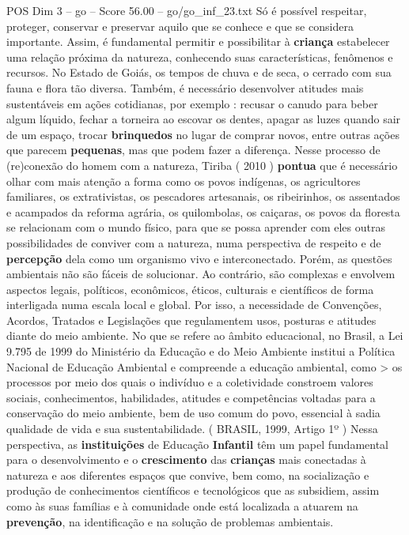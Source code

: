 \begin{textsample}{POS Dim 3 – go – Score 56.00 – go/go\_inf\_23.txt}
Só é possível respeitar, proteger, conservar e preservar aquilo que se conhece e que se considera importante.
Assim, é fundamental permitir e possibilitar à \textbf{criança} estabelecer uma relação próxima da natureza, conhecendo suas características, fenômenos e recursos.
No Estado de Goiás, os tempos de chuva e de seca, o cerrado com sua fauna e flora tão diversa.
Também, é necessário desenvolver atitudes mais sustentáveis em ações cotidianas, por exemplo : recusar o canudo para beber algum líquido, fechar a torneira ao escovar os dentes, apagar as luzes quando sair de um espaço, trocar \textbf{brinquedos} no lugar de comprar novos, entre outras ações que parecem \textbf{pequenas}, mas que podem fazer a diferença.
Nesse processo de (re)conexão do homem com a natureza, Tiriba ( 2010 ) \textbf{pontua} que é necessário olhar com mais atenção a forma como os povos indígenas, os agricultores familiares, os extrativistas, os pescadores artesanais, os ribeirinhos, os assentados e acampados da reforma agrária, os quilombolas, os caiçaras, os povos da floresta se relacionam com o mundo físico, para que se possa aprender com eles outras possibilidades de conviver com a natureza, numa perspectiva de respeito e de \textbf{percepção} dela como um organismo vivo e interconectado.
Porém, as questões ambientais não são fáceis de solucionar.
Ao contrário, são complexas e envolvem aspectos legais, políticos, econômicos, éticos, culturais e científicos de forma interligada numa escala local e global.
Por isso, a necessidade de Convenções, Acordos, Tratados e Legislações que regulamentem usos, posturas e atitudes diante do meio ambiente.
No que se refere ao âmbito educacional, no Brasil, a Lei 9.795 de 1999 do Ministério da Educação e do Meio Ambiente institui a Política Nacional de Educação Ambiental e compreende a educação ambiental, como > os processos por meio dos quais o indivíduo e a coletividade constroem valores sociais, conhecimentos, habilidades, atitudes e competências voltadas para a conservação do meio ambiente, bem de uso comum do povo, essencial à sadia qualidade de vida e sua sustentabilidade. ( BRASIL, 1999, Artigo 1º ) Nessa perspectiva, as \textbf{instituições} de Educação \textbf{Infantil} têm um papel fundamental para o desenvolvimento e o \textbf{crescimento} das \textbf{crianças} mais conectadas à natureza e aos diferentes espaços que convive, bem como, na socialização e produção de conhecimentos científicos e tecnológicos que as subsidiem, assim como às suas famílias e à comunidade onde está localizada a atuarem na \textbf{prevenção}, na identificação e na solução de problemas ambientais.

\end{textsample}
